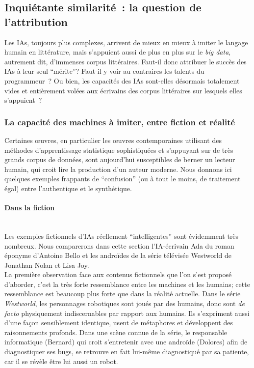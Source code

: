 \documentclass{article}
\newcommand{\subsubsubsection}[1]{\paragraph{#1}\mbox{}\\}
\begin{document}
		\subsection{Inquiétante similarité~: la question de l'attribution}
			Les IAs, toujours plus complexes, arrivent de mieux en mieux à imiter le langage humain en littérature, mais s'appuient aussi de plus en plus sur le \textit{big data}, autrement dit, d'immenses corpus littéraires. Faut-il donc attribuer le succès des IAs à leur seul ``mérite''? Faut-il y voir au contraires les talents du programmeur~? Ou bien, les capacités des IAs sont-elles désormais totalement vides et entièrement volées aux écrivains des corpus littéraires sur lesquels elles s'appuient~?
			\subsubsection{La capacité des machines à imiter, entre fiction et réalité}
				Certaines œuvres, en particulier les œuvres contemporaines utilisant des méthodes d'apprentissage statistique sophistiquées et s'appuyant sur de très grands corpus de données, sont aujourd'hui susceptibles de berner un lecteur humain, qui croit lire la production d'un auteur moderne. Nous donnons ici quelques exemples frappants de ``confusion'' (ou à tout le moins, de traitement égal) entre l'authentique et le synthétique.
				\subsubsubsection{Dans la fiction}
					Les exemples fictionnels d'IAs réellement ``intelligentes'' sont évidemment très nombreux. Nous comparerons dans cette section l'IA-écrivain Ada du roman éponyme d'Antoine Bello \cite{bello2016} et les androïdes de la série télévisée Westworld de Jonathan Nolan et Lisa Joy.\\
					
					La première observation face aux contenus fictionnels que l'on s'est proposé d'aborder, c'est la très forte ressemblance entre les machines et les humains; cette ressemblance est beaucoup plus forte que dans la réalité actuelle. Dans le série \textit{Westworld}, les personnages robotiques sont joués par des humains, donc sont \textit{de facto} physiquement indiscernables par rapport aux humains. Ils s'expriment aussi d'une façon sensiblement identique, usent de métaphores et développent des raisonnements profonds. Dans une scène connue de la série, le responsable informatique (Bernard) qui croit s'entretenir avec une androïde (Dolores) afin de diagnostiquer ses bugs, se retrouve en fait lui-même diagnostiqué par sa patiente, car il se révèle être lui aussi un robot.\\
					
\end{document}
